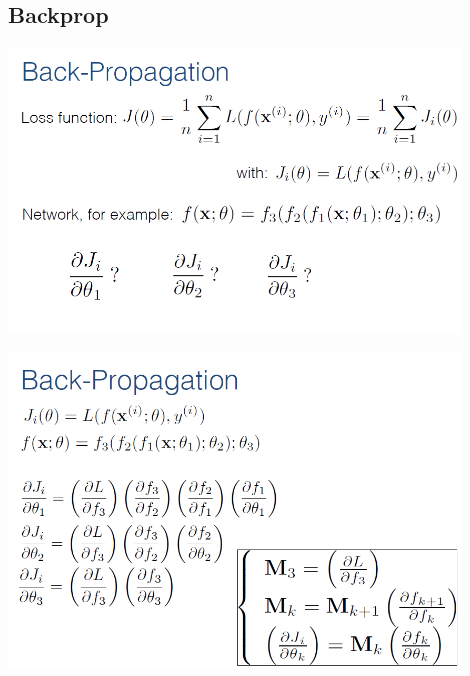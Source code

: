 \documentclass{beamer}
\begin{document}
\subsection{Backprop}
\begin{frame}
\includegraphics[width=0.9\textwidth]{images/backprop_1.PNG} 
\end{frame}
\begin{frame}
\includegraphics[width=0.9\textwidth]{images/backprop_3.PNG} 
\end{frame}
\end{document}
